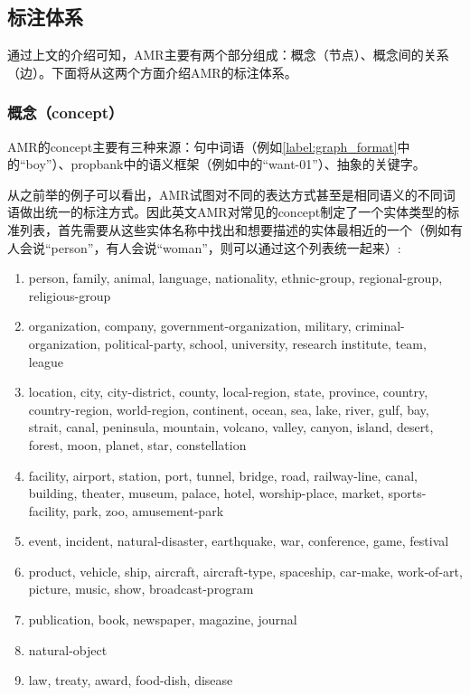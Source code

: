 \documentclass[master, winfont]{njuthesis}
\begin{document}
\subsection{标注体系}
通过上文的介绍可知，AMR主要有两个部分组成：概念（节点）、概念间的关系（边）。下面将从这两个方面介绍AMR的标注体系。

\subsubsection{概念（concept）}
AMR的concept主要有三种来源：句中词语（例如\ref{label:graph_format}中的“boy”）、propbank中的语义框架（例如\label{label:graph_format}中的“want-01”）、抽象的关键字。

从之前举的例子可以看出，AMR试图对不同的表达方式甚至是相同语义的不同词语做出统一的标注方式。因此英文AMR对常见的concept制定了一个实体类型的标准列表，首先需要从这些实体名称中找出和想要描述的实体最相近的一个（例如有人会说“person”，有人会说“woman”，则可以通过这个列表统一起来）:
\begin{enumerate}
  \item person, family, animal, language, nationality, ethnic-group, regional-group, religious-group
  \item organization, company, government-organization, military, criminal-organization, political-party, school, university, research institute, team, league
  \item location, city, city-district, county, local-region, state, province, country, country-region, world-region, continent, ocean, sea, lake, river, gulf, bay, strait, canal, peninsula, mountain, volcano, valley, canyon, island, desert, forest, moon, planet, star, constellation
  \item facility, airport, station, port, tunnel, bridge, road, railway-line, canal, building, theater, museum, palace, hotel, worship-place, market, sports-facility, park, zoo, amusement-park
  \item event, incident, natural-disaster, earthquake, war, conference, game, festival
  \item product, vehicle, ship, aircraft, aircraft-type, spaceship, car-make, work-of-art, picture, music, show, broadcast-program
  \item publication, book, newspaper, magazine, journal
  \item natural-object
  \item law, treaty, award, food-dish, disease
\end{enumerate}
\end{document}
